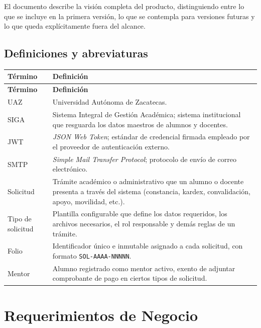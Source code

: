 \documentclass[12pt,letterpaper]{report}
\begin{document}
El documento describe la visión completa del producto, distinguiendo entre lo que se incluye en la primera versión, lo que se contempla para versiones futuras y lo que queda explícitamente fuera del alcance.

\section{Definiciones y abreviaturas}

\begin{longtable}{|L{3cm}|L{10.5cm}|}
    \hline
    \textbf{Término} & \textbf{Definición} \\
    \hline
    \endfirsthead
    \hline
    \textbf{Término} & \textbf{Definición} \\
    \hline
    \endhead
    \hline
    \endfoot

    UAZ & Universidad Autónoma de Zacatecas. \\
    \hline
    SIGA & Sistema Integral de Gestión Académica; sistema institucional que resguarda los datos maestros de alumnos y docentes. \\
    \hline
    JWT & \textit{JSON Web Token}; estándar de credencial firmada empleado por el proveedor de autenticación externo. \\
    \hline
    SMTP & \textit{Simple Mail Transfer Protocol}; protocolo de envío de correo electrónico. \\
    \hline
    Solicitud & Trámite académico o administrativo que un alumno o docente presenta a través del sistema (constancia, kardex, convalidación, apoyo, movilidad, etc.). \\
    \hline
    Tipo de solicitud & Plantilla configurable que define los datos requeridos, los archivos necesarios, el rol responsable y demás reglas de un trámite. \\
    \hline
    Folio & Identificador único e inmutable asignado a cada solicitud, con formato \texttt{SOL-AAAA-NNNNN}. \\
    \hline
    Mentor & Alumno registrado como mentor activo, exento de adjuntar comprobante de pago en ciertos tipos de solicitud. \\
    \hline
\end{longtable}

\chapter{Requerimientos de Negocio}
\end{document}
